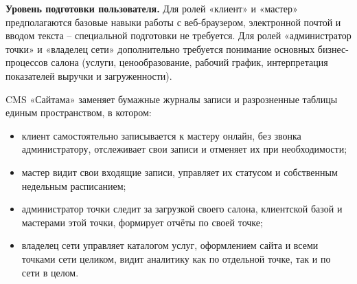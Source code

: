 \textbf{Уровень подготовки пользователя.} Для ролей «клиент» и «мастер»
предполагаются базовые навыки работы с веб-браузером, электронной почтой
и вводом текста -- специальной подготовки не требуется. Для ролей
«администратор точки» и «владелец сети» дополнительно требуется понимание
основных бизнес-процессов салона (услуги, ценообразование, рабочий
график, интерпретация показателей выручки и загруженности).



CMS «Сайтама» заменяет бумажные журналы записи и разрозненные таблицы
единым пространством, в котором:
\begin{itemize}
  \item клиент самостоятельно записывается к мастеру онлайн, без звонка
        администратору, отслеживает свои записи и отменяет их при
        необходимости;
  \item мастер видит свои входящие записи, управляет их статусом и
        собственным недельным расписанием;
  \item администратор точки следит за загрузкой своего салона, клиентской
        базой и мастерами этой точки, формирует отчёты по своей точке;
  \item владелец сети управляет каталогом услуг, оформлением сайта и всеми
        точками сети целиком, видит аналитику как по отдельной точке, так
        и по сети в целом.
\end{itemize}


